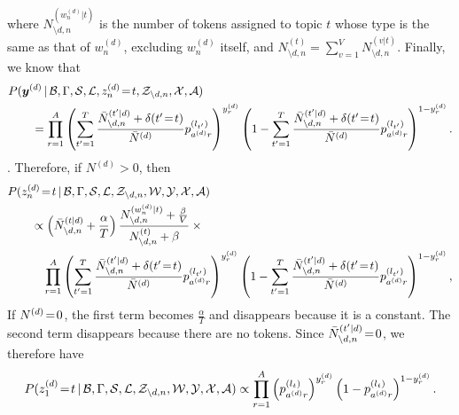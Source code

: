 \documentclass[10pt,english,oneside]{article}
\begin{document}
where $N^{(w_n^{(d)}|t)}_{\setminus d, n}$ is the number of tokens
assigned to topic $t$ whose type is the same as that of $w_n^{(d)}$,
excluding $w_n^{(d)}$ itself, and $N^{(t)}_{\setminus d, n} =
\sum_{v=1}^V N^{(v|t)}_{\setminus d, n}$. Finally, we know that
\begin{align}
  &P(\boldsymbol{y}^{(d)} \,|\, \mathcal{B}, \Gamma, \mathcal{S}, \mathcal{L},
  z_n^{(d)} \!=\! t, \mathcal{Z}_{\setminus d, n}, \mathcal{X},
  \mathcal{A}) \notag \\
  &\qquad  =
  \prod_{r=1}^A 
  \left(   \sum_{t'=1}^T \frac{\bar{N}^{(t'|d)}_{\setminus d, n} +
    \delta(t' \!=\! t)}{\bar{N}^{(d)}} p_{a^{(d)}r}^{(l_{t'})} \right)^{y^{(d)}_r} \left( 1 -   \sum_{t'=1}^T \frac{\bar{N}^{(t'|d)}_{\setminus d, n} +
    \delta(t' \!=\! t)}{\bar{N}^{(d)}} p_{a^{(d)}r}^{(l_{t'})} \right)^{1 - y^{(d)}_r}.
  \end{align}.
Therefore, if $N^{(d)} > 0$, then 
\begin{align}
  &P(z_n^{(d)} \!=\! t \,|\, \mathcal{B}, \Gamma, \mathcal{S}, \mathcal{L},
    \mathcal{Z}_{\setminus d, n}, \mathcal{W}, \mathcal{Y},
    \mathcal{X}, \mathcal{A}) \notag \\
        &\qquad \propto \left( \bar{N}^{(t|d)}_{\setminus d, n} +
    \frac{\alpha}{T}\right) \frac{N^{(w_n^{(d)}|t)}_{\setminus
        d, n} + \frac{\beta}{V}}{N^{(t)}_{\setminus d, n} + \beta}
    \times {} \notag \\
    &\qquad \quad
  \prod_{r=1}^A 
  \left(   \sum_{t'=1}^T \frac{\bar{N}^{(t'|d)}_{\setminus d, n} +
    \delta(t' \!=\! t)}{\bar{N}^{(d)}} p_{a^{(d)}r}^{(l_{t'})} \right)^{y^{(d)}_r} \left( 1 -   \sum_{t'=1}^T \frac{\bar{N}^{(t'|d)}_{\setminus d, n} +
    \delta(t' \!=\! t)}{\bar{N}^{(d)}} p_{a^{(d)}r}^{(l_{t'})} \right)^{1 - y^{(d)}_r},
\end{align}
If $N^{(d)} \!=\! 0$, the first term becomes $\frac{\alpha}{T}$ and
disappears because it is a constant. The second term disappears
because there are no tokens. Since $\bar{N}^{(t'|d)}_{\setminus
  d, n} \!=\! 0 $, we therefore have
\begin{equation}
  P(z_1^{(d)} \!=\! t \,|\, \mathcal{B}, \Gamma, \mathcal{S}, \mathcal{L},
    \mathcal{Z}_{\setminus d, n}, \mathcal{W}, \mathcal{Y},
    \mathcal{X}, \mathcal{A}) 
    \propto 
    \prod_{r=1}^A \left( p_{a^{(d)}r}^{(l_t)} \right)^{y^{(d)}_r} \left( 1 - p_{a^{(d)}r}^{(l_t)}\right)^{1 - y^{(d)}_r}.
\end{equation}
\end{document}

